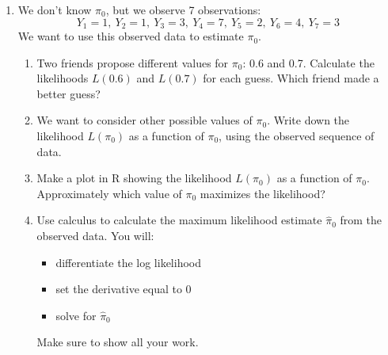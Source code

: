 \documentclass[11pt]{article}
\begin{document}
\begin{enumerate}
\item[4.] We don't know $\pi_0$, but we observe 7 observations:
$$Y_1 = 1, \ Y_2 = 1, \ Y_3 = 3, \ Y_4 = 7, \ Y_5 = 2, \ Y_6 = 4, \ Y_7 = 3$$
We want to use this observed data to estimate $\pi_0$.

\begin{enumerate}
\item Two friends propose different values for $\pi_0$: 0.6 and 0.7. Calculate the likelihoods $L(0.6)$ and $L(0.7)$ for each guess. Which friend made a better guess?

\item We want to consider other possible values of $\pi_0$. Write down the likelihood $L(\pi_0)$ as a function of $\pi_0$, using the observed sequence of data.

\item Make a plot in R showing the likelihood $L(\pi_0)$ as a function of $\pi_0$. Approximately which value of $\pi_0$ maximizes the likelihood?

\item Use calculus to calculate the maximum likelihood estimate $\widehat{\pi}_0$ from the observed data. You will:
\begin{itemize}
\item differentiate the log likelihood
\item set the derivative equal to 0
\item solve for $\widehat{\pi}_0$
\end{itemize}
Make sure to show all your work.
\end{enumerate}
\end{enumerate}
\end{document}
